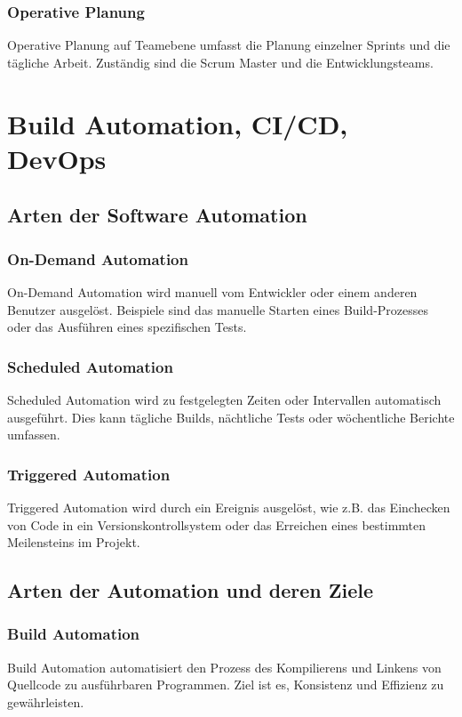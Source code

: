 \subsubsection{Operative Planung}
Operative Planung auf Teamebene umfasst die Planung einzelner Sprints und die tägliche Arbeit. Zuständig sind die Scrum Master und die Entwicklungsteams.

\section{Build Automation, CI/CD, DevOps}

\subsection{Arten der Software Automation}

\subsubsection{On-Demand Automation}
On-Demand Automation wird manuell vom Entwickler oder einem anderen Benutzer ausgelöst. Beispiele sind das manuelle Starten eines Build-Prozesses oder das Ausführen eines spezifischen Tests.

\subsubsection{Scheduled Automation}
Scheduled Automation wird zu festgelegten Zeiten oder Intervallen automatisch ausgeführt. Dies kann tägliche Builds, nächtliche Tests oder wöchentliche Berichte umfassen.

\subsubsection{Triggered Automation}
Triggered Automation wird durch ein Ereignis ausgelöst, wie z.B. das Einchecken von Code in ein Versionskontrollsystem oder das Erreichen eines bestimmten Meilensteins im Projekt.

\subsection{Arten der Automation und deren Ziele}

\subsubsection{Build Automation}
Build Automation automatisiert den Prozess des Kompilierens und Linkens von Quellcode zu ausführbaren Programmen. Ziel ist es, Konsistenz und Effizienz zu gewährleisten.

